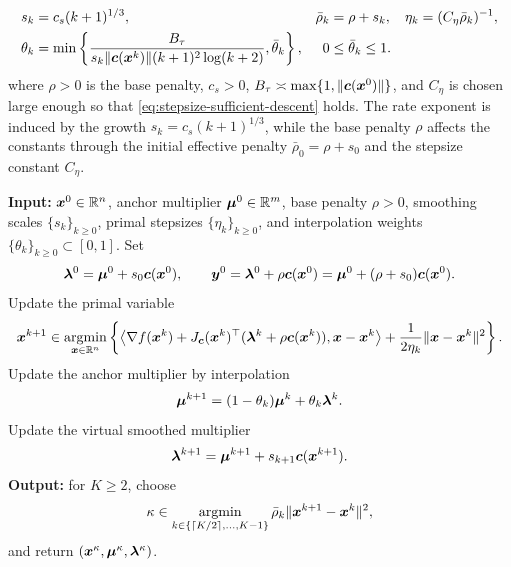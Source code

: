 \documentclass[10pt]{article}
\begin{document}
\begin{align*}
    s_k&=c_s(k+1)^{1/3},
    &
    \bar\rho_k&=\rho+s_k,
    &
    \eta_k&=(C_\eta\bar\rho_k)^{-1},\\
    \theta_k
    &=
    \min\left\{
    \frac{B_\tau}
    {s_k\|\bm{c}(\bm{x}^k)\|(k+1)^2\log(k+2)},
    \bar\theta_k
    \right\},
    &
    0&\le\bar\theta_k\le1 .
\end{align*}
where $\rho>0$ is the base penalty, $c_s>0$,
$B_\tau\asymp\max\{1,\|\bm{c}(\bm{x}^0)\|\}$, and $C_\eta$ is chosen large enough
so that \eqref{eq:stepsize-sufficient-descent} holds.
The rate exponent is induced by the growth
$s_k=c_s(k+1)^{1/3}$, while the base penalty $\rho$ affects the constants
through the initial effective penalty $\bar\rho_0=\rho+s_0$ and the
stepsize constant $C_\eta$. 

 
\begin{algorithm}[H]
    \caption{Dual-damping linearized ALM}
    \label{alg:adaptive-dsalm-interpolation}
    \small
    \begin{algorithmic}[1]
        \STATE \textbf{Input:} $\bm{x}^0\in\mathbb{R}^n$, anchor multiplier
        $\bm{\mu}^0\in\mathbb{R}^m$, base penalty $\rho>0$, smoothing scales
        $\{s_k\}_{k\ge0}$, primal stepsizes $\{\eta_k\}_{k\ge0}$,
        and interpolation weights $\{\theta_k\}_{k\ge0}\subset[0,1]$.
        \STATE Set
        \[
            \bm{\lambda}^0=\bm{\mu}^0+s_0\bm{c}(\bm{x}^0),
            \qquad
            \bm{y}^0=\bm{\lambda}^0+\rho\bm{c}(\bm{x}^0)
            =
            \bm{\mu}^0+(\rho+s_0)\bm{c}(\bm{x}^0).
        \]
            \STATE Update the primal variable
            \[
                \bm{x}^{k+1}
                \in
                \operatorname*{\mathrm{argmin}}_{\bm{x}\in\mathbb{R}^n}
                \left\{
                \left\langle
                \nabla f(\bm{x}^k)
                +J_{\bm{c}}(\bm{x}^k)^\top(\bm{\lambda}^k+\rho\bm{c}(\bm{x}^k)),
                \bm{x}-\bm{x}^k
                \right\rangle
                +
                \frac{1}{2\eta_k}\|\bm{x}-\bm{x}^k\|^2
                \right\}.
            \]
            \STATE Update the anchor multiplier by interpolation
            \[
                \bm{\mu}^{k+1}
                =
                (1-\theta_k)\bm{\mu}^k+\theta_k\bm{\lambda}^k.
            \]
            \STATE Update the virtual smoothed multiplier
            \[
                \bm{\lambda}^{k+1}
                =
                \bm{\mu}^{k+1}+s_{k+1}\bm{c}(\bm{x}^{k+1}).
            \]
        \ENDFOR
        \STATE \textbf{Output:} for $K\ge2$, choose
        \[
            \kappa
            \in
            \operatorname*{\mathrm{argmin}}_{k\in\{\lceil K/2\rceil,\ldots,K-1\}}
            \bar\rho_k\|\bm{x}^{k+1}-\bm{x}^k\|^2,
        \]
        and return $(\bm{x}^\kappa,\bm{\mu}^\kappa,\bm{\lambda}^\kappa)$.
    \end{algorithmic}
\end{algorithm}
 
\end{document}
